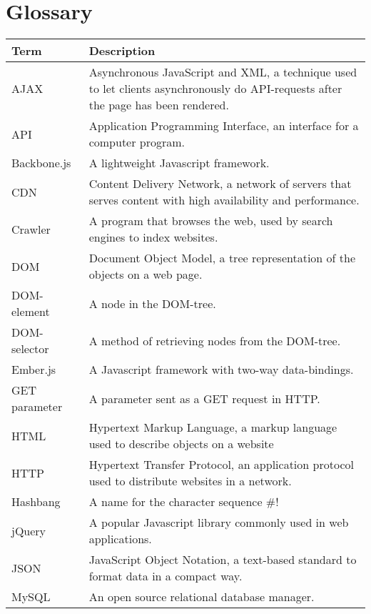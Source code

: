 \chapter*{Glossary}

\thispagestyle{empty}

\begin{table}[H]
	\begin{center}
		\begin{tabular}{ m{3cm} | m{11cm} }
			\hline
			\textbf{Term}	& \textbf{Description} \\ \hline
			AJAX			& Asynchronous JavaScript and XML, a technique used to let clients asynchronously do API-requests after the page has been rendered. \\ \hline
			API				& Application Programming Interface, an interface for a computer program. \\ \hline
			Backbone.js		& A lightweight Javascript framework. \\ \hline
			CDN				& Content Delivery Network, a network of servers that serves content with high availability and performance. \\ \hline
			Crawler			& A program that browses the web, used by search engines to index websites. \\ \hline
			DOM				& Document Object Model, a tree representation of the objects on a web page. \\ \hline
			DOM-element		& A node in the DOM-tree. \\ \hline
			DOM-selector	& A method of retrieving nodes from the DOM-tree. \\ \hline
			Ember.js		& A Javascript framework with two-way data-bindings. \\ \hline
			GET parameter	& A parameter sent as a GET request in HTTP. \\ \hline
			HTML			& Hypertext Markup Language, a markup language used to describe objects on a website \\ \hline
			HTTP			& Hypertext Transfer Protocol, an application protocol used to distribute websites in a network. \\ \hline
			Hashbang		& A name for the character sequence \#! \\ \hline
			jQuery			& A popular Javascript library commonly used in web applications. \\ \hline
			JSON			& JavaScript Object Notation, a text-based standard to format data in a compact way. \\ \hline
			MySQL			& An open source relational database manager. \\ \hline

\end{tabular}
\end{center}
\end{table}
